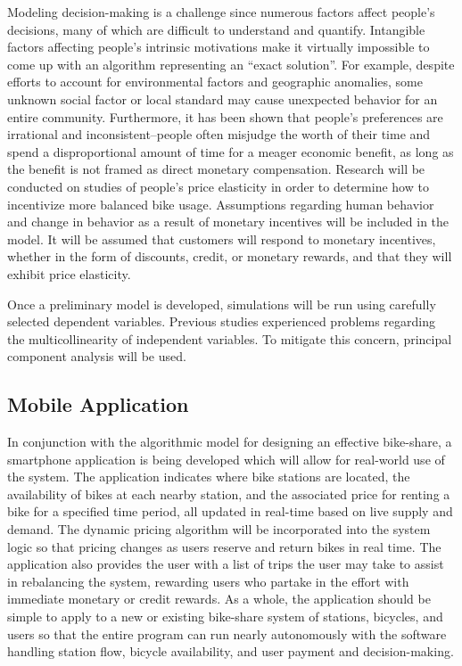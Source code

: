 \documentclass{sig-alternate}
\begin{document}
Modeling decision-making is a challenge since numerous factors affect people's decisions, many of which are difficult to understand and quantify. Intangible factors affecting people's intrinsic motivations make it virtually impossible to come up with an algorithm representing an ``exact solution''. For example, despite efforts to account for environmental factors and geographic anomalies, some unknown social factor or local standard may cause unexpected behavior for an entire community. Furthermore, it has been shown that people's preferences are irrational and inconsistent--people often misjudge the worth of their time and spend a disproportional amount of time for a meager economic benefit, as long as the benefit is not framed as direct monetary compensation. Research will be conducted on studies of people's price elasticity in order to determine how to incentivize more balanced bike usage. Assumptions regarding human behavior and change in behavior as a result of monetary incentives will be included in the model. It will be assumed that customers will respond to monetary incentives, whether in the form of discounts, credit, or monetary rewards, and that they will exhibit price elasticity.\newline

Once a preliminary model is developed, simulations will be run using carefully selected dependent variables. Previous studies experienced problems regarding the multicollinearity of independent variables. To mitigate this concern, principal component analysis will be used.

\subsection{Mobile Application}
In conjunction with the algorithmic model for designing an effective bike-share, a smartphone application is being developed which will allow for real-world use of the system. The application indicates where bike stations are located, the availability of bikes at each nearby station, and the associated price for renting a bike for a specified time period, all updated in real-time based on live supply and demand. The dynamic pricing algorithm will be incorporated into the system logic so that pricing changes as users reserve and return bikes in real time. The application also provides the user with a list of trips the user may take to assist in rebalancing the system, rewarding users who partake in the effort with immediate monetary or credit rewards. As a whole, the application should be simple to apply to a new or existing bike-share system of stations, bicycles, and users so that the entire program can run nearly autonomously with the software handling station flow, bicycle availability, and user payment and decision-making.\newline
\end{document}
